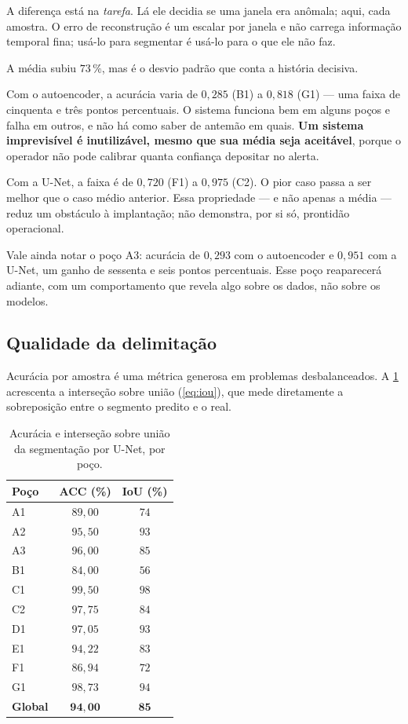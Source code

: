 A diferença está na \emph{tarefa}. Lá ele decidia se uma janela era anômala; aqui, cada
amostra. O erro de reconstrução é um escalar por janela e não carrega informação
temporal fina; usá-lo para segmentar é usá-lo para o que ele não faz.

\begin{destaque}
A média subiu $73\,\%$, mas é o desvio padrão que conta a história decisiva.

Com o autoencoder, a acurácia varia de $0{,}285$ (B1) a $0{,}818$ (G1) --- uma faixa de
cinquenta e três pontos percentuais. O sistema funciona bem em alguns poços e falha em
outros, e não há como saber de antemão em quais. \textbf{Um sistema imprevisível é
inutilizável, mesmo que sua média seja aceitável}, porque o operador não pode calibrar
quanta confiança depositar no alerta.

Com a U-Net, a faixa é de $0{,}720$ (F1) a $0{,}975$ (C2). O pior caso passa a ser
melhor que o caso médio anterior. Essa propriedade --- e não apenas a média --- reduz
um obstáculo à implantação; não demonstra, por si só, prontidão operacional.
\end{destaque}

Vale ainda notar o poço A3: acurácia de $0{,}293$ com o autoencoder e $0{,}951$ com a
U-Net, um ganho de sessenta e seis pontos percentuais. Esse poço reaparecerá adiante,
com um comportamento que revela algo sobre os dados, não sobre os modelos.

\subsection{Qualidade da delimitação}

Acurácia por amostra é uma métrica generosa em problemas desbalanceados. A
\cref{tab:seg-iou} acrescenta a interseção sobre união (\cref{eq:iou}), que mede
diretamente a sobreposição entre o segmento predito e o real.

\begin{table}[htbp]
\centering
\caption{Acurácia e interseção sobre união da segmentação por U-Net, por poço.}
\label{tab:seg-iou}
\small
\begin{tabular}{lcc}
\toprule
\textbf{Poço} & \textbf{ACC (\%)} & \textbf{IoU (\%)} \\
\midrule
A1 & $89{,}00$ & $74$ \\
A2 & $95{,}50$ & $93$ \\
A3 & $96{,}00$ & $85$ \\
B1 & $84{,}00$ & $56$ \\
C1 & $99{,}50$ & $98$ \\
C2 & $97{,}75$ & $84$ \\
D1 & $97{,}05$ & $93$ \\
E1 & $94{,}22$ & $83$ \\
F1 & $86{,}94$ & $72$ \\
G1 & $98{,}73$ & $94$ \\
\midrule
\textbf{Global} & $\bm{94{,}00}$ & $\bm{85}$ \\
\bottomrule
\end{tabular}
\end{table}

